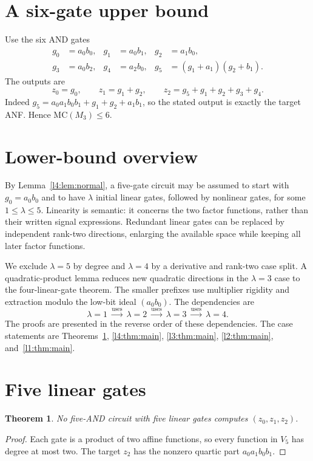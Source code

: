 \documentclass[11pt,a4paper]{article}
\theoremstyle{plain}
\newtheorem{theorem}{Theorem}
\theoremstyle{remark}
\begin{document}
\section{A six-gate upper bound}\label{sec:upper}
Use the six AND gates
\begin{align*}
g_0&=a_0b_0,&g_1&=a_0b_1,&g_2&=a_1b_0,\\
g_3&=a_0b_2,&g_4&=a_2b_0,&g_5&=(g_1+a_1)(g_2+b_1).
\end{align*}
The outputs are
\[
 z_0=g_0,\qquad z_1=g_1+g_2,\qquad
 z_2=g_5+g_1+g_2+g_3+g_4.
\]
Indeed $g_5=a_0a_1b_0b_1+g_1+g_2+a_1b_1$, so the stated output is exactly the target ANF. Hence $\mathrm{MC}(M_3)\le6$.

\section{Lower-bound overview}\label{sec:overview}
By Lemma~\ref{l4:lem:normal}, a five-gate circuit may be assumed to start with $g_0=a_0b_0$ and to have $\lambda$ initial linear gates, followed by nonlinear gates, for some $1\le\lambda\le5$. Linearity is semantic: it concerns the two factor functions, rather than their written signal expressions. Redundant linear gates can be replaced by independent rank-two directions, enlarging the available space while keeping all later factor functions.

We exclude $\lambda=5$ by degree and $\lambda=4$ by a derivative and rank-two case split. A quadratic-product lemma reduces new quadratic directions in the $\lambda=3$ case to the four-linear-gate theorem. The smaller prefixes use multiplier rigidity and extraction modulo the low-bit ideal $(a_0b_0)$. The dependencies are
\[
\boxed{\lambda=1}\ \xrightarrow{\text{uses}}\
\boxed{\lambda=2}\ \xrightarrow{\text{uses}}\
\boxed{\lambda=3}\ \xrightarrow{\text{uses}}\
\boxed{\lambda=4}.
\]
The proofs are presented in the reverse order of these dependencies. The case statements are Theorems~\ref{thm:lambda5}, \ref{l4:thm:main}, \ref{l3:thm:main}, \ref{l2:thm:main}, and~\ref{l1:thm:main}.

\section{Five linear gates}\label{sec:lambda5}
\begin{theorem}\label{thm:lambda5}
No five-AND circuit with five linear gates computes $(z_0,z_1,z_2)$.
\end{theorem}
\begin{proof}
Each gate is a product of two affine functions, so every function in $V_5$ has degree at most two. The target $z_2$ has the nonzero quartic part $a_0a_1b_0b_1$.
\end{proof}
\end{document}
